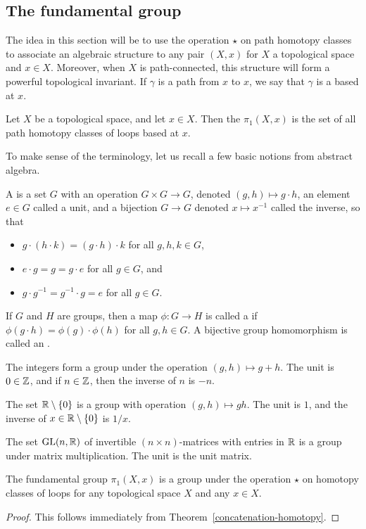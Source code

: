 \subsection{The fundamental group}
The idea in this section will be to use the operation $\star$ on path homotopy classes to associate an algebraic structure to any pair $(X,x)$ for $X$ a topological space and $x \in X$. Moreover, when $X$ is path-connected, this structure will form a powerful topological invariant. If $\gamma$ is a path from $x$ to $x$, we say that $\gamma$ is a  based at $x$.
\begin{defn}
  Let $X$ be a topological space, and let $x \in X$. Then the  $\pi_1(X,x)$ is the set of all path homotopy classes of loops based at $x$. 
\end{defn}
To make sense of the terminology, let us recall a few basic notions from abstract algebra.
\begin{defn}
  A  is a set $G$ with an operation $G \times G \to G$, denoted $(g,h) \mapsto g \cdot h$, an element $e \in G$ called a unit, and a bijection $G \to G$ denoted $x \mapsto x^{-1}$ called the inverse, so that
  \begin{itemize}
    \item $g \cdot (h \cdot k) = (g \cdot h) \cdot k$ for all $g,h,k \in G$,
    \item $e \cdot g = g = g \cdot e$ for all $g \in G$, and
    \item $g \cdot g^{-1} = g^{-1} \cdot g = e$ for all $g \in G$.
  \end{itemize}
  If $G$ and $H$ are groups, then a map $\phi : G \to H$ is called a  if $\phi(g\cdot h) = \phi(g)\cdot\phi(h)$ for all $g,h \in G$. A bijective group homomorphism is called an .
\end{defn}
\begin{example}
  The integers form a group under the operation $(g,h) \mapsto g+h$. The unit is $0 \in \mathbb{Z}$, and if $n \in \mathbb{Z}$, then the inverse of $n$ is $-n$.
\end{example}
\begin{example}
  The set $\mathbb{R} \setminus \{0\}$ is a group with operation $(g,h) \mapsto gh$. The unit is $1$, and the inverse of $x \in \mathbb{R} \setminus \{0\}$ is $1/x$.
\end{example}
\begin{example}
  The set $\mathrm{GL}(n,\mathbb{R})$ of invertible $(n \times n)$-matrices with entries in $\mathbb{R}$ is a group under matrix multiplication. The unit is the unit matrix.
\end{example}
\begin{prop}
  The fundamental group $\pi_1(X,x)$ is a group under the operation $\star$ on homotopy classes of loops for any topological space $X$ and any $x \in X$.
\end{prop}
\begin{proof}
  This follows immediately from Theorem~\ref{concatenation-homotopy}.
\end{proof} 

